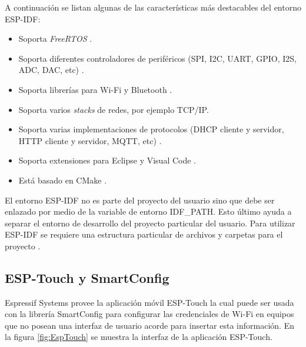 A continuación se listan algunas de las características más destacables del entorno ESP-IDF:

\begin{itemize}
\item Soporta \textit{FreeRTOS} \citep{ESPIDF:FreeRTOS}.
\item Soporta diferentes controladores de periféricos (SPI, I2C, UART, GPIO, I2S, ADC, DAC, etc) \citep{ESPIDF:PER}.
\item Soporta librerías para Wi-Fi \citep{ESPIDF:WiFi} y Bluetooth \citep{ESPIDF:bluetooth}.
\item Soporta varios \textit{stacks} de redes, por ejemplo TCP/IP.
\item Soporta varias implementaciones de protocolos (DHCP cliente y servidor, HTTP cliente y servidor, MQTT, etc) \citep{ESPIDF:PRO}.
\item Soporta extensiones para Eclipse \citep{ESPIDF:ECLIPSE} y Visual Code \citep{ESPIDF:VC}.
\item Está basado en CMake \citep{ESPIDF:CMake}.
\end{itemize}

El entorno ESP-IDF no es parte del proyecto del usuario sino que debe ser enlazado por medio de la variable de entorno IDF\_PATH. Esto último ayuda a separar el entorno de desarrollo del proyecto particular del usuario. Para utilizar ESP-IDF se requiere una estructura particular de archivos y carpetas para el proyecto \citep{ESPIDF:CMake_2}. 

\subsection{ESP-Touch y SmartConfig}

Espressif Systems provee la aplicación móvil ESP-Touch \citep{ESPTOUCH} la cual puede ser usada con la librería SmartConfig \citep{SMARTCONFIG} para configurar las credenciales de Wi-Fi en equipos que no posean una interfaz de usuario acorde para insertar esta información. En la figura \ref{fig:EspTouch} se muestra la interfaz de la aplicación ESP-Touch.

